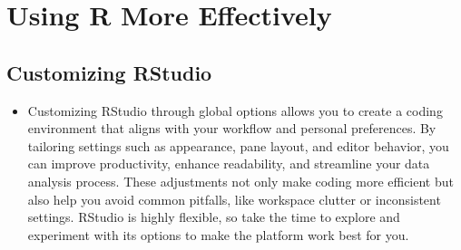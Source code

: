 \documentclass[
  letterpaper,
  DIV=11,
  numbers=noendperiod]{scrreprt}
\providecommand{\tightlist}{%
  \setlength{\itemsep}{0pt}\setlength{\parskip}{0pt}}\usepackage{longtable,booktabs,array}
\begin{document}

\chapter{Using R More Effectively}\label{using-r-more-effectively}

\section{Customizing RStudio}\label{customizing-rstudio}

\begin{itemize}
\tightlist
\item
  Customizing RStudio through global options allows you to create a
  coding environment that aligns with your workflow and personal
  preferences. By tailoring settings such as appearance, pane layout,
  and editor behavior, you can improve productivity, enhance
  readability, and streamline your data analysis process. These
  adjustments not only make coding more efficient but also help you
  avoid common pitfalls, like workspace clutter or inconsistent
  settings. RStudio is highly flexible, so take the time to explore and
  experiment with its options to make the platform work best for you.
\end{itemize}
\end{document}
